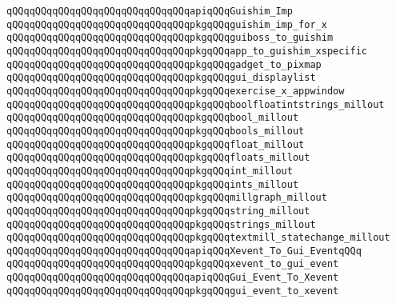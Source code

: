 \newline
\newline
\verb|qQQqqQQqqQQqqQQqqQQqqQQqqQQqqQQqapiqQQqGuishim_Imp|\newline
\verb|qQQqqQQqqQQqqQQqqQQqqQQqqQQqqQQqpkgqQQqguishim_imp_for_x|\newline
\verb|qQQqqQQqqQQqqQQqqQQqqQQqqQQqqQQqpkgqQQqguiboss_to_guishim|\newline
\verb|qQQqqQQqqQQqqQQqqQQqqQQqqQQqqQQqpkgqQQqapp_to_guishim_xspecific|\newline
\verb|qQQqqQQqqQQqqQQqqQQqqQQqqQQqqQQqpkgqQQqgadget_to_pixmap|\newline
\verb|qQQqqQQqqQQqqQQqqQQqqQQqqQQqqQQqpkgqQQqgui_displaylist|\newline
\verb|qQQqqQQqqQQqqQQqqQQqqQQqqQQqqQQqpkgqQQqexercise_x_appwindow|\newline
\newline
\verb|qQQqqQQqqQQqqQQqqQQqqQQqqQQqqQQqpkgqQQqboolfloatintstrings_millout|\newline
\verb|qQQqqQQqqQQqqQQqqQQqqQQqqQQqqQQqpkgqQQqbool_millout|\newline
\verb|qQQqqQQqqQQqqQQqqQQqqQQqqQQqqQQqpkgqQQqbools_millout|\newline
\verb|qQQqqQQqqQQqqQQqqQQqqQQqqQQqqQQqpkgqQQqfloat_millout|\newline
\verb|qQQqqQQqqQQqqQQqqQQqqQQqqQQqqQQqpkgqQQqfloats_millout|\newline
\verb|qQQqqQQqqQQqqQQqqQQqqQQqqQQqqQQqpkgqQQqint_millout|\newline
\verb|qQQqqQQqqQQqqQQqqQQqqQQqqQQqqQQqpkgqQQqints_millout|\newline
\verb|qQQqqQQqqQQqqQQqqQQqqQQqqQQqqQQqpkgqQQqmillgraph_millout|\newline
\verb|qQQqqQQqqQQqqQQqqQQqqQQqqQQqqQQqpkgqQQqstring_millout|\newline
\verb|qQQqqQQqqQQqqQQqqQQqqQQqqQQqqQQqpkgqQQqstrings_millout|\newline
\verb|qQQqqQQqqQQqqQQqqQQqqQQqqQQqqQQqpkgqQQqtextmill_statechange_millout|\newline
\newline
\verb|qQQqqQQqqQQqqQQqqQQqqQQqqQQqqQQqapiqQQqXevent_To_Gui_EventqQQq|\newline
\verb|qQQqqQQqqQQqqQQqqQQqqQQqqQQqqQQqpkgqQQqxevent_to_gui_event|\newline
\newline
\verb|qQQqqQQqqQQqqQQqqQQqqQQqqQQqqQQqapiqQQqGui_Event_To_Xevent|\newline
\verb|qQQqqQQqqQQqqQQqqQQqqQQqqQQqqQQqpkgqQQqgui_event_to_xevent|\newline
